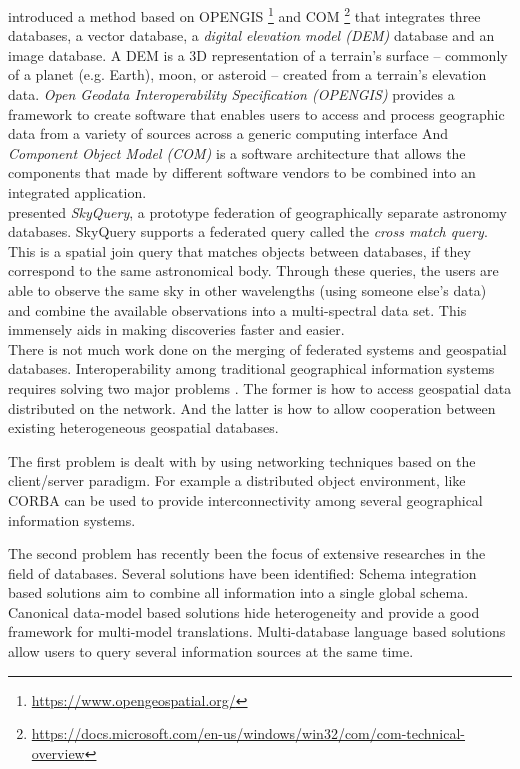 \documentclass[12pt,a4paper]{report}
\newcommand{\term}{\textit}
\newcommand{\acr}{\MakeUppercase}
\begin{document}
	\citet{Jian} introduced a method based on \acr{opengis} 
	\footnote{ \url{https://www.opengeospatial.org/}} and \acr{com} 
	\footnote{ \url{https://docs.microsoft.com/en-us/windows/win32/com/com-technical-overview}} 
	that integrates three databases, a vector database, a 
	\term{digital elevation model (\acr{dem})} database and an image database. 
	A \acr{dem} is a 3D representation of a terrain's surface – commonly of a 
	planet (e.g. Earth), moon, or asteroid – created from a terrain's elevation 
	data. \term{Open Geodata Interoperability Specification (\acr{opengis})} 
	provides a framework to create software that enables users to access and 
	process geographic data from a variety of sources across a generic computing 
	interface And \term{Component Object Model (\acr{com})} is a software 
	architecture that allows the components that made by different software 
	vendors to be combined into an integrated application. 
	\\

	\citet{Malik} presented \term{SkyQuery}, a prototype federation of 
	geographically separate astronomy databases. SkyQuery supports a federated 
	query called the \term{cross match query}. This is a spatial join query 
	that matches objects between databases, if they correspond to the same 
	astronomical body. Through these queries, the users are able to observe the 
	same sky in other wavelengths (using someone else’s data) and combine the 
	available observations into a multi-spectral data set. This immensely aids 
	in making discoveries faster and easier.
	\\

	There is not much work done on the merging of federated systems and geospatial databases.
	Interoperability among traditional geographical information systems requires solving two major problems \citep{Gong}. The former is how to access geospatial data distributed on the network. And the latter is how to allow cooperation between existing heterogeneous geospatial databases.
	\par
	The first problem is dealt with by using networking techniques based on the client/server paradigm. For example a distributed object environment, like CORBA can be used to provide interconnectivity among several geographical information systems.
	\par
	The second problem has recently been the focus of extensive researches in the field of databases. Several solutions have been identified: Schema integration based solutions aim to combine all information into a single global schema. Canonical data-model based solutions hide heterogeneity and provide a good framework for multi-model translations. Multi-database language based solutions allow users to query several information sources at the same time.
	\\ 
\end{document}
